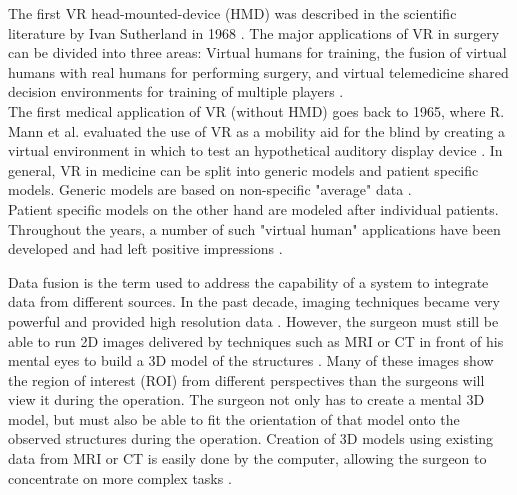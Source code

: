 The first VR head-mounted-device (HMD) was described in the scientific literature by Ivan Sutherland in 1968 \cite{sutherland1968head}.
The major applications of VR in surgery can be divided into three areas:
Virtual humans for training, the fusion of virtual humans with real humans for performing surgery, 
and virtual telemedicine shared decision environments for training of multiple players \cite{486713}.
\\
The first medical application of VR (without HMD) goes back to 1965, where R. Mann et al. evaluated the use of VR as a mobility aid for the blind 
by creating a virtual environment in which to test an hypothetical auditory display device \cite{mann1965evaluation}.
In general, VR in medicine can be split into generic models and patient specific models.
Generic models are based on non-specific "average" data \cite{486713}.
\\
Patient specific models on the other hand are modeled after individual patients.
Throughout the years, a number of such "virtual human" applications have been developed and had left positive impressions \cite{486713}.

Data fusion is the term used to address the capability of a system to integrate data from different sources.
In the past decade, imaging techniques became very powerful and provided high resolution data \cite{RN2}.
However, the surgeon must still be able to run 2D images delivered by techniques such as MRI or CT in front of his mental eyes to build a 3D model of the structures \cite{Fonseca.2018}.
Many of these images show the region of interest (ROI) from different perspectives than the surgeons will view it during the operation.
The surgeon not only has to create a mental 3D model, but must also be able to fit the orientation of that model onto the observed structures during the operation.
Creation of 3D models using existing data from MRI or CT is easily done by the computer, allowing the surgeon to concentrate on more complex tasks \cite{486713}.

